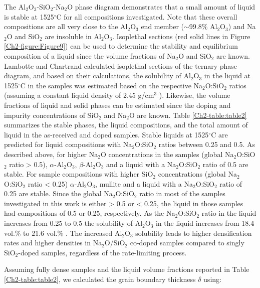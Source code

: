 The Al$_{2}$O$_{3}$-SiO$_{2}$-Na$_{2}$O phase diagram demonstrates that a small amount of liquid is stable at 1525$^{\circ}$C for all compositions investigated. Note that these overall compositions are all very close to the Al$_{2}$O$_{3}$ end member ($\sim$99.8\% Al$_{2}$O$_{3}$) and Na$_{2}$O and SiO$_{2}$ are insoluble in Al$_{2}$O$_{3}$. Isoplethal sections (red solid lines in Figure \ref{Ch2-figure:Figure9}) can be used to determine the stability and equilibrium composition of a liquid since the volume fractions of Na$_{2}$O and SiO$_{2}$ are known. Lambotte and Chartrand \cite{Lambotte2013a} calculated isoplethal sections of the ternary phase diagram, and based on their calculations, the solubility of Al$_{2}$O$_{3}$ in the liquid at 1525$^{\circ}$C in the samples was estimated based on the respective Na$_{2}$O:SiO$_{2}$ ratios (assuming a constant liquid density of 2.45 g/cm$^{3}$ \cite{Standard2013,Day1962}). Likewise, the volume fractions of liquid and solid phases can be estimated since the doping and impurity concentrations of SiO$_{2}$ and Na$_{2}$O are known. Table \ref{Ch2-table:table2} summarizes the stable phases, the liquid compositions, and the total amount of liquid in the as-received and doped samples. Stable liquids at 1525$^{\circ}$C are predicted for liquid compositions with Na$_{2}$O:SiO$_{2}$ ratios between 0.25 and 0.5. As described above, for higher Na$_{2}$O concentrations in the samples (global Na$_{2}$O:SiO$_{2}$ ratio > 0.5), $\alpha$-Al$_{2}$O$_{3}$, $\beta$-Al$_{2}$O$_{3}$ and a liquid with a Na$_{2}$O:SiO$_{2}$ ratio of 0.5 are stable. For sample compositions with higher SiO$_{2}$ concentrations (global Na$_{2}$O:SiO$_{2}$ ratio < 0.25) $\alpha$-Al$_{2}$O$_{3}$, mullite and a liquid with a Na$_{2}$O:SiO$_{2}$ ratio of 0.25 are stable. Since the global Na$_{2}$O:SiO$_{2}$ ratio in most of the samples investigated in this work is either > 0.5 or < 0.25, the liquid in those samples had compositions of 0.5 or 0.25, respectively. As the Na$_{2}$O:SiO$_{2}$ ratio in the liquid increases from 0.25 to 0.5 the solubility of Al$_{2}$O$_{3}$ in the liquid increases from 18.4 vol.\% to 21.6 vol.\% \cite{Lambotte2013a}. The increased Al$_{2}$O$_{3}$ solubility leads to higher densification rates and higher densities in Na$_{2}$O/SiO$_{2}$ co-doped samples compared to singly SiO$_{2}$-doped samples, regardless of the rate-limiting process. 

Assuming fully dense samples and the liquid volume fractions reported in Table \ref{Ch2-table:table2}, we calculated the grain boundary thickness $\delta$ using:

